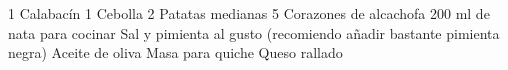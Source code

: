 1 Calabacín
1 Cebolla
2 Patatas medianas
5 Corazones de alcachofa
200 ml de nata para cocinar
Sal y pimienta al gusto (recomiendo añadir bastante pimienta negra)
Aceite de oliva
Masa para quiche
Queso rallado
